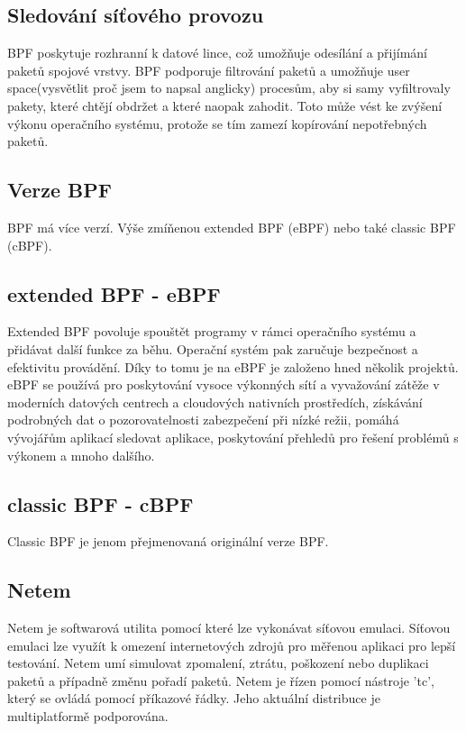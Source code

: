 \subsection*{Sledování síťového provozu}
BPF poskytuje rozhranní k datové lince, což umožňuje odesílání a přijímání paketů spojové vrstvy. BPF podporuje filtrování paketů a umožňuje user space(vysvětlit proč jsem to napsal anglicky) procesům,
aby si samy vyfiltrovaly pakety, které chtějí obdržet a které naopak zahodit. Toto může vést ke zvýšení výkonu operačního systému, protože se tím zamezí kopírování nepotřebných paketů.

\subsection*{Verze BPF}
BPF má více verzí. Výše zmíňenou extended BPF (eBPF) nebo také classic BPF (cBPF).

\subsection*{extended BPF - eBPF}
Extended BPF povoluje spouštět programy v rámci operačního systému a přidávat další funkce za běhu.
Operační systém pak zaručuje bezpečnost a efektivitu provádění. Díky to tomu je na eBPF je založeno hned několik projektů.
eBPF se používá pro  poskytování vysoce výkonných sítí a vyvažování zátěže v moderních datových centrech a cloudových nativních prostředích,
získávání podrobných dat o pozorovatelnosti zabezpečení při nízké režii, pomáhá vývojářům aplikací sledovat aplikace,
poskytování přehledů pro řešení problémů s výkonem a mnoho dalšího.

\subsection*{classic BPF - cBPF}
Classic BPF je jenom přejmenovaná originální verze BPF.

\iffalse
https://man7.org/linux/man-pages/man2/bpf.2.html
https://ebpf.io/
\fi

\subsection{Netem}\cite{netem}
Netem je softwarová utilita pomocí které lze vykonávat síťovou emulaci. Síťovou emulaci lze využít k omezení internetových zdrojů pro měřenou aplikaci pro lepší testování.
Netem umí simulovat zpomalení, ztrátu, poškození nebo duplikaci paketů a případně změnu pořadí paketů. Netem je řízen pomocí nástroje 'tc', který se ovládá pomocí příkazové řádky.
Jeho aktuální distribuce je multiplatformě podporována.

